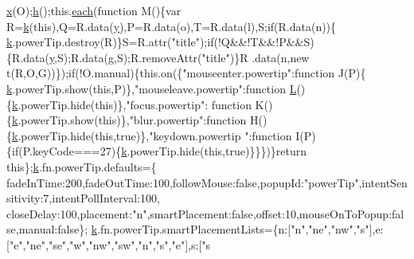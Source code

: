 \begin{DoxyCode}
{       \hyperlink{sensor_8h_a6c4b361d72eb3767ba424ac9a6ecf52b}{x}(O);\hyperlink{all__1a_8js_aebecdaf2444e2be39f4804412d6a3bf8}{h}();this.\hyperlink{jquery_8js_a871ff39db627c54c710a3e9909b8234c}{each}(\textcolor{keyword}{function} M()\{var R=\hyperlink{jquery_8js_ab26645c014aa005ecedef329ecf58c99}{k}(\textcolor{keyword}{this}),Q=R.data(\hyperlink{sensor_8h_a0ed6a908288e0cd87f79c1b5ab56d07c}{y}),P=R.data(o),T=R.data(l),S;\textcolor{keywordflow}{if}(R.data(n))\{
      \hyperlink{jquery_8js_ab26645c014aa005ecedef329ecf58c99}{k}.powerTip.destroy(R)\}S=R.attr(\textcolor{stringliteral}{"title"});\textcolor{keywordflow}{if}(!Q&&!T&&!P&&S)\{R.data(\hyperlink{sensor_8h_a0ed6a908288e0cd87f79c1b5ab56d07c}{y},S);R.data(g,S);R.removeAttr(\textcolor{stringliteral}{"title"})\}R
      .data(n,\textcolor{keyword}{new} t(R,O,G))\});\textcolor{keywordflow}{if}(!O.manual)\{this.on(\{\textcolor{stringliteral}{"mouseenter.powertip"}:\textcolor{keyword}{function} J(P)\{
      \hyperlink{jquery_8js_ab26645c014aa005ecedef329ecf58c99}{k}.powerTip.show(\textcolor{keyword}{this},P)\},\textcolor{stringliteral}{"mouseleave.powertip"}:\textcolor{keyword}{function} \hyperlink{jquery_8js_a38ee4c0b5f4fe2a18d0c783af540d253}{L}()\{\hyperlink{jquery_8js_ab26645c014aa005ecedef329ecf58c99}{k}.powerTip.hide(\textcolor{keyword}{this})\},\textcolor{stringliteral}{"focus.powertip"}:\textcolor{keyword}{
      function} K()\{\hyperlink{jquery_8js_ab26645c014aa005ecedef329ecf58c99}{k}.powerTip.show(\textcolor{keyword}{this})\},\textcolor{stringliteral}{"blur.powertip"}:\textcolor{keyword}{function} H()\{\hyperlink{jquery_8js_ab26645c014aa005ecedef329ecf58c99}{k}.powerTip.hide(\textcolor{keyword}{this},\textcolor{keyword}{true})\},\textcolor{stringliteral}{"keydown.powertip
      "}:\textcolor{keyword}{function} I(P)\{\textcolor{keywordflow}{if}(P.keyCode===27)\{\hyperlink{jquery_8js_ab26645c014aa005ecedef329ecf58c99}{k}.powerTip.hide(\textcolor{keyword}{this},\textcolor{keyword}{true})\}\}\})\}\textcolor{keywordflow}{return} \textcolor{keyword}{this}\};\hyperlink{jquery_8js_ab26645c014aa005ecedef329ecf58c99}{k}.fn.powerTip.defaults=\{
      fadeInTime:200,fadeOutTime:100,followMouse:\textcolor{keyword}{false},popupId:\textcolor{stringliteral}{"powerTip"},intentSensitivity:7,intentPollInterval:100,
      closeDelay:100,placement:\textcolor{stringliteral}{"n"},smartPlacement:\textcolor{keyword}{false},offset:10,mouseOnToPopup:\textcolor{keyword}{false},manual:\textcolor{keyword}{false}\};
      \hyperlink{jquery_8js_ab26645c014aa005ecedef329ecf58c99}{k}.fn.powerTip.smartPlacementLists=\{n:[\textcolor{stringliteral}{"n"},\textcolor{stringliteral}{"ne"},\textcolor{stringliteral}{"nw"},\textcolor{stringliteral}{"s"}],e:[\textcolor{stringliteral}{"e"},\textcolor{stringliteral}{"ne"},\textcolor{stringliteral}{"se"},\textcolor{stringliteral}{"w"},\textcolor{stringliteral}{"nw"},\textcolor{stringliteral}{"sw"},\textcolor{stringliteral}{"n"},\textcolor{stringliteral}{"s"},\textcolor{stringliteral}{"e"}],s:[\textcolor{stringliteral}{"s
}}
\end{DoxyCode}
